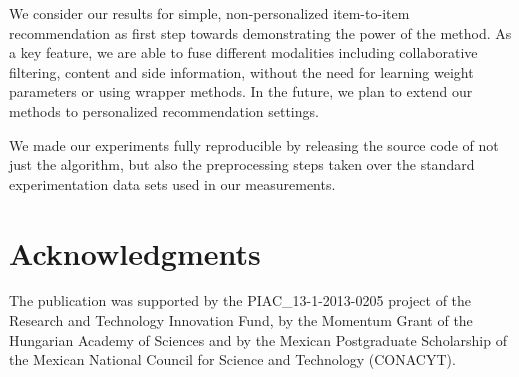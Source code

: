\documentclass[preprint]{sig-alternate-05-2015}
\begin{document}
We consider our results for simple, non-personalized item-to-item recommendation as first step towards demonstrating the power of the method.
As a key feature, we are able to fuse different modalities including collaborative filtering, content and side information, without the need for learning weight parameters or using wrapper methods.
In the future, we plan to extend our methods to personalized recommendation settings.

We made our experiments fully reproducible by releasing the source code of not just the algorithm, but also the preprocessing steps taken over the standard 
experimentation data sets used in our measurements.

\section{Acknowledgments}
The publication was supported by the PIAC\_13-1-2013-0205 project of the Research and Technology Innovation Fund, by the Momentum Grant of the Hungarian Academy of Sciences and by the Mexican Postgraduate Scholarship of the Mexican National Council for Science and Technology (CONACYT). 
 



\end{document}
